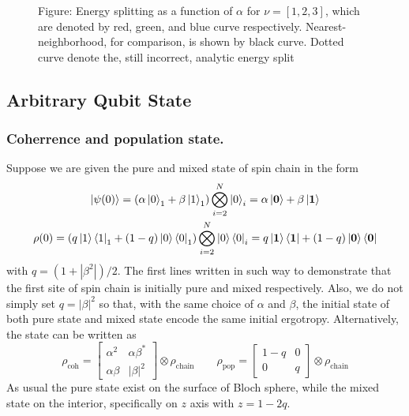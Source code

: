 \documentclass[../../../main.tex]{subfiles}
\begin{document}
\begin{figure}
  \centering
  \caption*{Figure: Energy splitting as a function of $\alpha$ for $\nu=[1,2,3]$, which are denoted by red, green, and blue curve respectively. Nearest-neighborhood, for comparison, is shown by black curve. Dotted curve denote the, still incorrect, analytic energy split}
\end{figure}

\subsection{Arbitrary Qubit State}
\subsubsection{Coherrence and population state.}
Suppose we are given the pure and mixed state of spin chain in the form
\begin{gather*}
  \ket{\psi(0)} = \left(\alpha\ket{0}_1 + \beta\ket{1}_1\right)\bigotimes_{i=2}^{N}\ket{0}_i  = \alpha\ket{\mathbf{0}} + \beta\ket{\mathbf{1}}\\
  \rho(0) = \left(q\ket{1}\bra{1}_1 + (1-q)\ket{0}\bra{0}_1\right)\bigotimes_{i=2}^{N}\ket{0}\bra{0}_i = q\ket{\mathbf{1}}\bra{\mathbf{1}} + (1-q)\ket{\mathbf{0}}\bra{\mathbf{0}}
\end{gather*}
with $q = (1+|\beta^2|)/2$.
The first lines written in such way to demonstrate that the first site of spin chain is initially pure and mixed respectively.
Also, we do not simply set $q=|\beta|^2$ so that, with the same choice of $\alpha$ and $\beta$, the initial state of both pure state and mixed state encode the same initial ergotropy.
Alternatively, the state can be written as
\begin{equation*}
  \rho_\text{coh}
  = \begin{bmatrix}
    \alpha^2    & \alpha\beta^* \\
    \alpha\beta & |\beta|^2
  \end{bmatrix}
  \otimes \rho_\text{chain}
  \qquad
  \rho_\text{pop}
  = \begin{bmatrix}
    1-q & 0 \\
    0   & q
  \end{bmatrix}
  \otimes \rho_\text{chain}
\end{equation*}
As usual the pure state exist on the surface of Bloch sphere, while the mixed state on the interior, specifically on $z$ axis with $z = 1-2q$.
\end{document}
